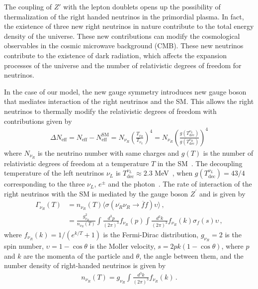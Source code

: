 \documentclass[12pt]{article}
\begin{document}

The coupling of $Z'$ with the lepton doublets opens up the possibility
of thermalization of the right handed neutrinos in the primordial
plasma.
In fact, the existence of three new right neutrinos in nature
contribute to the total energy density of the universe. These new
contributions can modify the cosmological observables in the cosmic
microwave background (CMB). These new neutrinos contribute to the
existence of dark radiation, which affects the expansion processes of
the universe and the number of relativistic degrees of freedom for
neutrinos.

In the case of our model, the new gauge symmetry introduces  new gauge boson that mediates interaction of the right neutrinos and the SM. This allows the right neutrinos to thermally modify the relativistic degrees of freedom with contributions given by~\cite{Anchordoqui:2012qu,Anchordoqui:2011nh}
%
\begin{align*}
    \Delta N_{\text{eff}} = N_{\text{eff}} - N^{\text{SM}}_{\text{eff}} = N_{\nu_R} \left( \frac{T_{\nu_{R}}}{T_{\nu_{L}}} \right)^{4} = N_{\nu_R} \left( \frac{g(T^{\nu_{L}}_{\text{dec}})}{g(T^{\nu_{R}}_{\text{dec}})} \right)^{4}
\end{align*}
%
where $N_{\nu_R}$ is the neutrino number with same charges and $g(T)$ is the number of relativistic degrees of freedom at a temperature $T$ in the SM~\cite{Aghanim:2018eyx}. The decoupling temperature of the left neutrinos $\nu_L$ is $ T^{\nu_{L}}_{\text{dec}} \approx 2.3 $ MeV~\cite{Enqvist:1991gx}, when $g(T^{\nu_{L}}_{ \text{dec}}) = 43/4 $ corresponding to the three $\nu_{L}$, $e^{\pm} $ and the photon~\cite{Kolb:1990vq}. The rate of interaction of the right neutrinos with the SM is mediated by the gauge boson $Z^{\prime} $ and is given by~\cite{SolagurenBeascoa:2012cz}
%
\begin{align*}
    \Gamma_{\nu_R} (T) &= n_{\nu_R}(T) \langle \sigma(\overline{\nu_{R}} \nu_{R} \to \overline{f} f) \upsilon \rangle \,, \\
    &= \frac{g^{2}_{\nu_R}}{n_{\nu_R}(T)} \int \frac{d^{3} p}{(2 \pi)^{3}} f_{\nu_R}(p) \int \frac{d^{3} k}{(2 \pi)^{3}} f_{\nu_R}(k) \sigma_{f}(s) \upsilon\,,
\end{align*}
%
where $f_{\nu_R}(k)=1/(e^{k/T}+1)$ is the Fermi-Dirac distribution, $g_{\nu_R} = 2$ is the spin number, $\upsilon = 1-\cos{\theta}$ is the Moller velocity, $s = 2 p k (1-\cos{\theta})$, where $p$ and $k$ are the momenta of the particle and $\theta$, the angle between them, and the number density of right-handed neutrinos is given by
\begin{align*}
n_{\nu_R}(T) = g_{\nu_R} \int \frac{d^{3} k}{(2 \pi)^{3}} f_{\nu_R}(k)\,.
\end{align*}
\end{document}
